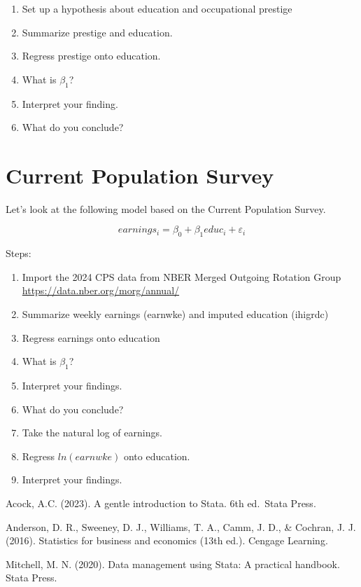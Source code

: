 \documentclass[
]{book}
\providecommand{\tightlist}{%
  \setlength{\itemsep}{0pt}\setlength{\parskip}{0pt}}
\begin{document}
\begin{enumerate}
\def\labelenumi{\arabic{enumi}.}
\tightlist
\item
  Set up a hypothesis about education and occupational prestige
\item
  Summarize prestige and education.
\item
  Regress prestige onto education.
\item
  What is \(\beta_1\)?
\item
  Interpret your finding.
\item
  What do you conclude?
\end{enumerate}

\section{Current Population Survey}\label{current-population-survey}

Let's look at the following model based on the Current Population Survey.

\[ earnings_i = \beta_0 + \beta_1 educ_i + \varepsilon_i \]

Steps:

\begin{enumerate}
\def\labelenumi{\arabic{enumi}.}
\tightlist
\item
  Import the 2024 CPS data from NBER Merged Outgoing Rotation Group \url{https://data.nber.org/morg/annual/}
\item
  Summarize weekly earnings (earnwke) and imputed education (ihigrdc)
\item
  Regress earnings onto education
\item
  What is \(\beta_1\)?
\item
  Interpret your findings.
\item
  What do you conclude?
\item
  Take the natural log of earnings.
\item
  Regress \(ln(earnwke)\) onto education.
\item
  Interpret your findings.
\end{enumerate}

Acock, A.C. (2023). A gentle introduction to Stata. 6th ed.~Stata Press.

Anderson, D. R., Sweeney, D. J., Williams, T. A., Camm, J. D., \& Cochran, J. J. (2016). Statistics for business and economics (13th ed.). Cengage Learning.

Mitchell, M. N. (2020). Data management using Stata: A practical handbook. Stata Press.


\end{document}
